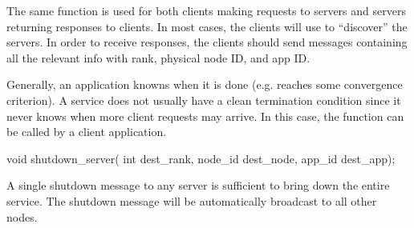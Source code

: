 The same  function is used for both clients making requests to servers and servers returning responses to clients.
In most cases, the clients will use  to ``discover'' the servers.
In order to receive responses, the clients should send messages containing all the relevant info with rank, physical node ID, and app ID.

Generally, an application knowns when it is done (e.g. reaches some convergence criterion). 
A service does not usually have a clean termination condition since it never knows when more client requests may arrive.
In this case, the function  can be called by a client application.

\begin{CppCode}
void shutdown_server(
  int dest_rank,
  node_id dest_node,
  app_id dest_app);
\end{CppCode}

A single shutdown message to any server is sufficient to bring down the entire service.
The shutdown message will be automatically broadcast to all other nodes.





